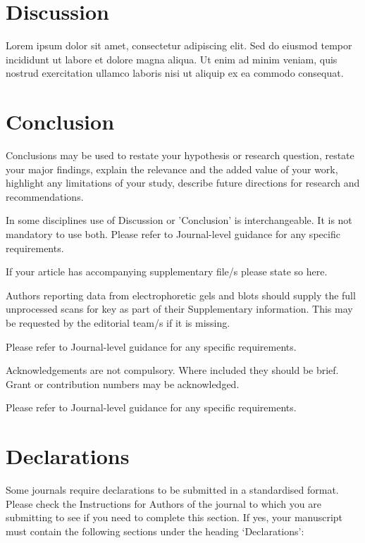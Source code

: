 \documentclass[pdflatex,sn-basic]{sn-jnl}           %
\theoremstyle{thmstyleone}%
\theoremstyle{thmstyletwo}%
\theoremstyle{thmstylethree}%
\begin{document}
\section{Discussion}\label{sec6}

Lorem ipsum dolor sit amet, consectetur adipiscing elit. Sed do eiusmod tempor incididunt ut labore et dolore magna aliqua. Ut enim ad minim veniam, quis nostrud exercitation ullamco laboris nisi ut aliquip ex ea commodo consequat.

\section{Conclusion}\label{sec13}

Conclusions may be used to restate your hypothesis or research question, restate your major findings, explain the relevance and the added value of your work, highlight any limitations of your study, describe future directions for research and recommendations. 

In some disciplines use of Discussion or 'Conclusion' is interchangeable. It is not mandatory to use both. Please refer to Journal-level guidance for any specific requirements. 

\backmatter


If your article has accompanying supplementary file/s please state so here. 

Authors reporting data from electrophoretic gels and blots should supply the full unprocessed scans for key as part of their Supplementary information. This may be requested by the editorial team/s if it is missing.

Please refer to Journal-level guidance for any specific requirements.


Acknowledgements are not compulsory. Where included they should be brief. Grant or contribution numbers may be acknowledged.

Please refer to Journal-level guidance for any specific requirements.

\section*{Declarations}

Some journals require declarations to be submitted in a standardised format. Please check the Instructions for Authors of the journal to which you are submitting to see if you need to complete this section. If yes, your manuscript must contain the following sections under the heading `Declarations':
\end{document}
